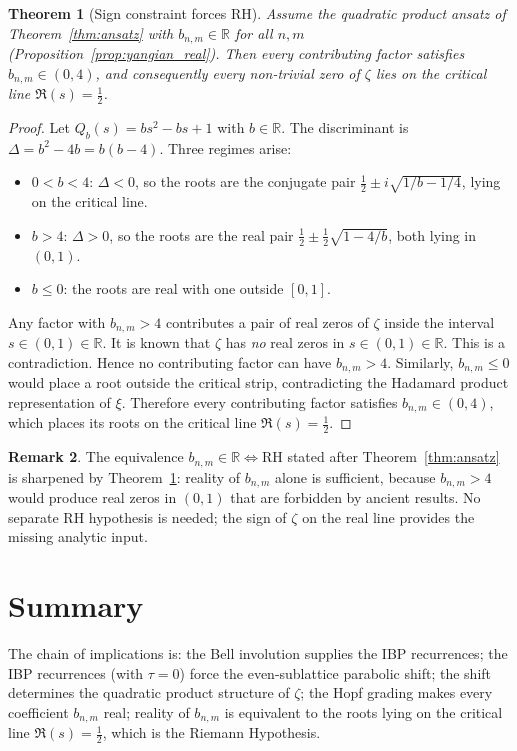 \documentclass[article]{article}
\theoremstyle{plain}
\newtheorem{theorem}{Theorem}[section]
\theoremstyle{definition}
\newtheorem{remark}[theorem]{Remark}
\newcommand{\R}{\mathbb{R}}
\begin{document}
\begin{theorem}[Sign constraint forces RH]\label{thm:sign_forces_rh}
Assume the quadratic product ansatz of Theorem~\ref{thm:ansatz} with
$b_{n,m}\in\R$ for all $n,m$ (Proposition~\ref{prop:yangian_real}).
Then every contributing factor satisfies $b_{n,m}\in(0,4)$, and consequently
every non-trivial zero of $\zeta$ lies on the critical line $\Re(s)=\tfrac{1}{2}$.
\end{theorem}

\begin{proof}
Let $Q_{b}(s)=bs^{2}-bs+1$ with $b\in\R$. The discriminant is
$\Delta=b^{2}-4b=b(b-4)$. Three regimes arise:
\begin{itemize}
  \item $0<b<4$: $\Delta<0$, so the roots are the conjugate pair
    $\tfrac{1}{2}\pm i\sqrt{1/b-1/4}$, lying on the critical line.
  \item $b>4$: $\Delta>0$, so the roots are the real pair
    $\tfrac{1}{2}\pm\tfrac{1}{2}\sqrt{1-4/b}$, both lying in $(0,1)$.
  \item $b\le 0$: the roots are real with one outside $[0,1]$.
\end{itemize}
Any factor with $b_{n,m}>4$ contributes a pair of real zeros of $\zeta$
inside the interval $s \in (0,1) \in\R$.
It is known that $\zeta$ has \emph{no} real zeros in $s \in (0,1) \in \R$.
This is a contradiction.
Hence no contributing factor can have $b_{n,m}>4$.
Similarly, $b_{n,m}\le 0$ would place a root outside the critical strip,
contradicting the Hadamard product representation of $\xi$.
Therefore every contributing factor satisfies $b_{n,m}\in(0,4)$,
which places its roots on the critical line $\Re(s)=\tfrac{1}{2}$.
\end{proof}

\begin{remark}
The equivalence $b_{n,m}\in\R \Leftrightarrow \text{RH}$ stated after
Theorem~\ref{thm:ansatz} is sharpened by Theorem~\ref{thm:sign_forces_rh}:
reality of $b_{n,m}$ alone is sufficient, because $b_{n,m}>4$
would produce real zeros in $(0,1)$ that are forbidden by ancient results.  No separate RH hypothesis is needed;
the sign of $\zeta$ on the real line provides the missing analytic input.
\end{remark}
\section{Summary}\label{sec:summary}

The chain of implications is: the Bell involution supplies the IBP recurrences;
the IBP recurrences (with $\tau=0$) force the even-sublattice parabolic shift;
the shift determines the quadratic product structure of $\zeta$; the Hopf
grading makes every coefficient $b_{n,m}$ real; reality of $b_{n,m}$ is
equivalent to the roots lying on the critical line $\Re(s)=\tfrac{1}{2}$,
which is the Riemann Hypothesis.



\end{document}

